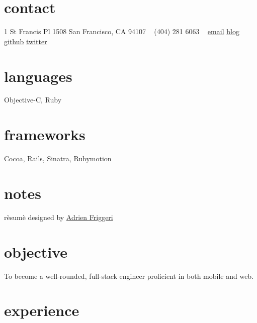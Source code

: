 \documentclass[]{friggeri-cv} %
\begin{document}


\begin{aside} %
\section{contact}
1 St Francis Pl 1508
San Francisco, CA
94107
~
(404) 281 6063
~
\href{mailto:bogardon@gmail.com}{email}
\href{http://bogardon.github.io}{blog}
\href{https://github.com/bogardon}{github}
\href{https://twitter.com/bogardon/}{twitter}
\section{languages}
Objective-C, Ruby
\section{frameworks}
Cocoa, Rails, Sinatra, Rubymotion
\section{notes}
r\`{e}sum\`{e} designed by \href{https://github.com/afriggeri/cv}{Adrien Friggeri}
\end{aside}


\section{objective}

To become a well-rounded, full-stack engineer proficient in both mobile and web.


\section{experience}
\end{document}
